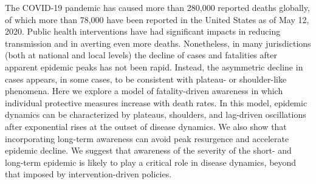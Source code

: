 The COVID-19 pandemic has caused more than 280,000 reported deaths
globally, of which more than 78,000 have been reported
in the United States as of May 12, 2020. Public health interventions
have had significant impacts in reducing transmission and in
averting even more deaths. Nonetheless, in many jurisdictions
(both at national and local levels) the decline of cases and fatalities
after apparent epidemic peaks has not been rapid.  Instead, the asymmetric
decline in cases appears, in some cases, to be consistent
with plateau- or shoulder-like phenomena.  
Here we explore a model of fatality-driven
awareness in which individual protective measures increase
with death rates.  In this model, epidemic dynamics
can be characterized by plateaus, shoulders,
and lag-driven oscillations after exponential rises
at the outset of disease dynamics. We also show that
incorporating long-term awareness can avoid peak resurgence and accelerate
epidemic decline.  We suggest that awareness of the severity of the short- and long-term epidemic is likely to play a critical
role in disease dynamics, beyond that imposed by intervention-driven policies.
